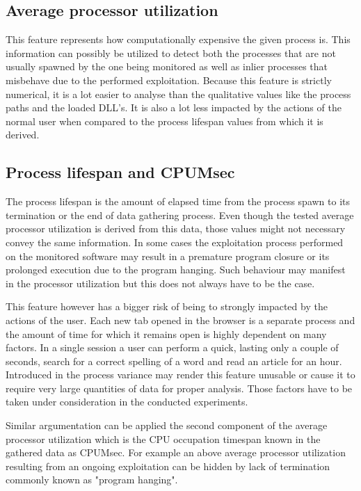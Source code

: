 \documentclass[a4paper,twoside,12pt]{book}
\begin{document}
\subsection{Average processor utilization}

This feature represents how computationally expensive the given process is. This information can possibly 
be utilized to detect both the processes that are not usually spawned by the one being monitored as well as
inlier processes that misbehave due to the performed exploitation. Because this feature is 
strictly numerical, it is a lot easier to analyse than the qualitative values like the process
paths and the loaded DLL's. It is also a lot less impacted by the actions of the normal user when
compared to the process lifespan values from which it is derived.

\subsection{Process lifespan and CPUMsec}

The process lifespan is the amount of elapsed time from the process spawn to its
termination or the end of data gathering process. Even though the tested average processor utilization 
is derived from this data, those values might not necessary convey the same information. In some cases
the exploitation process performed on the monitored software may result in a premature program
closure or its prolonged execution due to the program hanging. Such behaviour may manifest in the
processor utilization but this does not always have to be the case. 

This feature however has a bigger risk of being to strongly impacted by the actions of the user. 
Each new tab opened in the browser is a separate process and the amount of time for which it remains
open is highly dependent on many factors. In a single session a user can perform a quick, lasting 
only a couple of seconds, search for a correct spelling of a word and read an article for 
an hour. Introduced in the process variance may render this feature unusable or cause it to
require very large quantities of data for proper analysis. Those factors have to be taken 
under consideration in the conducted experiments.

Similar argumentation can be applied the second component of the average processor utilization which is
the CPU occupation timespan known in the gathered data as CPUMsec. For example an above average processor utilization
resulting from an ongoing exploitation can be hidden by lack of termination commonly known as "program hanging".
\end{document}
